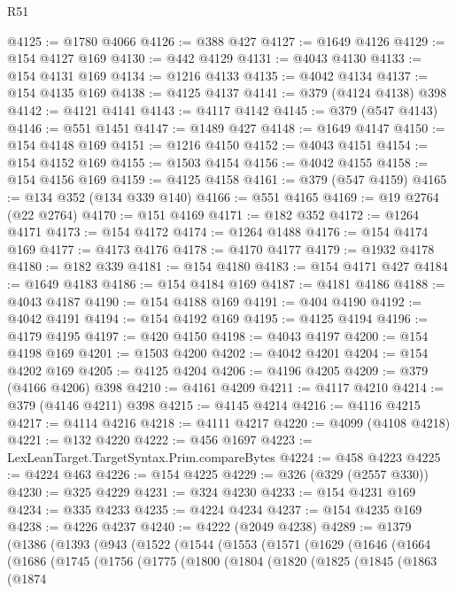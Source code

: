 \begin{lexlean}{R51}
\begin{coremodule}
@4125 := @1780 @4066
@4126 := @388 @427
@4127 := @1649 @4126
@4129 := @154 @4127 @169
@4130 := @442 @4129
@4131 := @4043 @4130
@4133 := @154 @4131 @169
@4134 := @1216 @4133
@4135 := @4042 @4134
@4137 := @154 @4135 @169
@4138 := @4125 @4137
@4141 := @379 (@4124 @4138) @398
@4142 := @4121 @4141
@4143 := @4117 @4142
@4145 := @379 (@547 @4143)
@4146 := @551 @1451
@4147 := @1489 @427
@4148 := @1649 @4147
@4150 := @154 @4148 @169
@4151 := @1216 @4150
@4152 := @4043 @4151
@4154 := @154 @4152 @169
@4155 := @1503 @4154
@4156 := @4042 @4155
@4158 := @154 @4156 @169
@4159 := @4125 @4158
@4161 := @379 (@547 @4159)
@4165 := @134 @352 (@134 @339 @140)
@4166 := @551 @4165
@4169 := @19 @2764 (@22 @2764)
@4170 := @151 @4169
@4171 := @182 @352
@4172 := @1264 @4171
@4173 := @154 @4172
@4174 := @1264 @1488
@4176 := @154 @4174 @169
@4177 := @4173 @4176
@4178 := @4170 @4177
@4179 := @1932 @4178
@4180 := @182 @339
@4181 := @154 @4180
@4183 := @154 @4171 @427
@4184 := @1649 @4183
@4186 := @154 @4184 @169
@4187 := @4181 @4186
@4188 := @4043 @4187
@4190 := @154 @4188 @169
@4191 := @404 @4190
@4192 := @4042 @4191
@4194 := @154 @4192 @169
@4195 := @4125 @4194
@4196 := @4179 @4195
@4197 := @420 @4150
@4198 := @4043 @4197
@4200 := @154 @4198 @169
@4201 := @1503 @4200
@4202 := @4042 @4201
@4204 := @154 @4202 @169
@4205 := @4125 @4204
@4206 := @4196 @4205
@4209 := @379 (@4166 @4206) @398
@4210 := @4161 @4209
@4211 := @4117 @4210
@4214 := @379 (@4146 @4211) @398
@4215 := @4145 @4214
@4216 := @4116 @4215
@4217 := @4114 @4216
@4218 := @4111 @4217
@4220 := @4099 (@4108 @4218)
@4221 := @132 @4220
@4222 := @456 @1697
@4223 := LexLeanTarget.TargetSyntax.Prim.compareBytes
@4224 := @458 @4223
@4225 := @4224 @463
@4226 := @154 @4225
@4229 := @326 (@329 (@2557 @330))
@4230 := @325 @4229
@4231 := @324 @4230
@4233 := @154 @4231 @169
@4234 := @335 @4233
@4235 := @4224 @4234
@4237 := @154 @4235 @169
@4238 := @4226 @4237
@4240 := @4222 (@2049 @4238)
@4289 := @1379
    (@1386
      (@1393
        (@943
          (@1522
            (@1544
              (@1553
                (@1571
                  (@1629
                    (@1646
                      (@1664
                        (@1686
                          (@1745
                            (@1756
                              (@1775
                                (@1800
                                  (@1804
                                    (@1820
                                      (@1825
                                        (@1845
                                          (@1863
                                            (@1874

\end{coremodule}
\end{lexlean}
